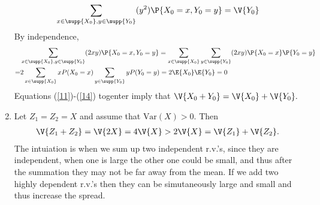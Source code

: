 \begin{exercise}
\begin{solution}
\begin{enumerate}
\begin{align}
			\sum_{x\in \supp{X_0},y\in \supp{Y_0}} (y^2 ) \P{X_0=x,Y_0=y}=\V{Y_0} \label{13}
		\end{align}
		By independence,
		\begin{align}
			&\sum_{x\in \supp{X_0},y\in \supp{Y_0}} ( 2xy) \P{X_0=x,Y_0=y} =  \sum_{x\in \supp{X_0}}\sum_{y\in \supp{Y_0}} ( 2xy) \P{X_0=x}\P{Y_0=y}\nonumber \\
			=& 2\sum_{x\in \supp{X_0}}  x   P(X_0=x) \sum_{y\in \supp{Y_0}}yP(Y_0=y)= 2 \E{X_0}\E{Y_0}=0 \label{14}
		\end{align}
		Equations (\ref{11})-(\ref{14}) togenter imply that $	\V{X_0+Y_0}=	\V{X_0}+	\V{Y_0}.$
		\item 	Let $Z_1=Z_2=X$ and assume that $\text{Var}(X)>0$. Then 
		\begin{align*}
			\V{Z_1+Z_2}=	\V{2X} =4\V{X} > 2\V{X}=\V{Z_1}+\V{Z_2}.
		\end{align*}
		The intuiation is when we sum up two independent r.v.'s, since they are independent, when one is large the other one could be small, and thus after the summation they may not be far away from the mean. If we add two highly dependent r.v.'s then they can be simutaneously large and small and thus increase the spread. 
	\end{enumerate}
	\end{solution}
\end{exercise}




